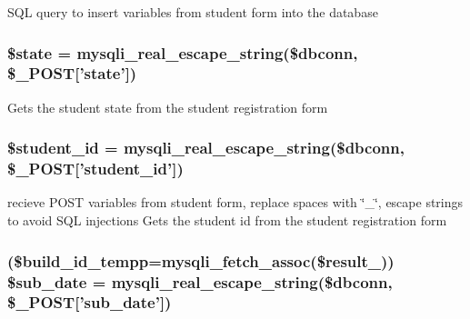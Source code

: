 \-S\-Q\-L query to insert variables from student form into the database \hypertarget{user__view_2validate_2studentVal_8php_ae82306c4f2d17d8dd5c7d8d916b33bed}{
\subsubsection[{\$state}]{\setlength{\rightskip}{0pt plus 5cm}\$state = mysqli\-\_\-real\-\_\-escape\-\_\-string(\$dbconn, \$\-\_\-\-P\-O\-S\-T\mbox{[}'state'\mbox{]})}}\label{user__view_2validate_2studentVal_8php_ae82306c4f2d17d8dd5c7d8d916b33bed}
\-Gets the student state from the student registration form \hypertarget{user__view_2validate_2studentVal_8php_a70806170d1b60ef7fb76db46f2bce5e3}{
\subsubsection[{\$student\-\_\-id}]{\setlength{\rightskip}{0pt plus 5cm}\$student\-\_\-id = mysqli\-\_\-real\-\_\-escape\-\_\-string(\$dbconn, \$\-\_\-\-P\-O\-S\-T\mbox{[}'student\-\_\-id'\mbox{]})}}\label{user__view_2validate_2studentVal_8php_a70806170d1b60ef7fb76db46f2bce5e3}
recieve \-P\-O\-S\-T variables from student form, replace spaces with \char`\"{}\-\_\-\char`\"{}, escape strings to avoid \-S\-Q\-L injections \-Gets the student id from the student registration form \hypertarget{user__view_2validate_2studentVal_8php_af7a8d782a047ba1d4e89d8d495b1e024}{
\subsubsection[{\$sub\-\_\-date}]{ (\$build\-\_\-id\-\_\-tempp=mysqli\-\_\-fetch\-\_\-assoc(\$result\-\_)) \$sub\-\_\-date = mysqli\-\_\-real\-\_\-escape\-\_\-string(\$dbconn, \$\-\_\-\-P\-O\-S\-T\mbox{[}'sub\-\_\-date'\mbox{]})}}\label{user__view_2validate_2studentVal_8php_af7a8d782a047ba1d4e89d8d495b1e024}
